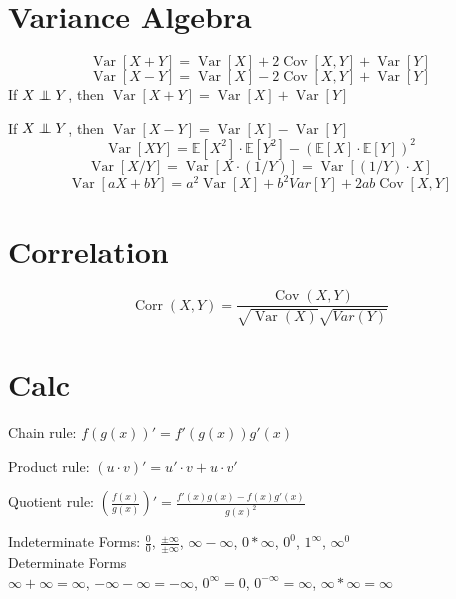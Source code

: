 \documentclass[twocolumn]{amsart}
\newcommand{\E}{\mathbb{E}}
\newcommand{\Cov}{\operatorname{Cov}}
\newcommand{\Corr}{\operatorname{Corr}}
\newcommand{\Var}{\operatorname{Var}}
\newcommand\independent{\protect\mathpalette{\protect\independenT}{\perp}}
\def\independenT#1#2{\mathrel{\rlap{$#1#2$}\mkern3mu{#1#2}}}
\begin{document}
\section*{Variance Algebra}
\begin{equation*}
  \Var[X + Y] = \Var[X] + 2\Cov[X, Y] + \Var[Y]
\end{equation*}
\begin{equation*}
  \Var[X - Y] = \Var[X] - 2\Cov[X, Y] + \Var[Y]
\end{equation*}
If \(X \independent Y\), then $\Var[X + Y] = \Var[X] + \Var[Y]$

If \(X \independent Y\), then $\Var[X - Y] = \Var[X] - \Var[Y]$
\begin{equation*}
  \Var[XY] = \E[X^2] \cdot \E[Y^2] - {(\E[X] \cdot \E[Y])}^2
\end{equation*}
\begin{equation*}
  \Var[X/Y] = \Var[X \cdot (1/Y)] = \Var[(1/Y) \cdot X]
\end{equation*}
\begin{equation*}
  \Var[aX+bY] = a^2\Var[X] + b^2 Var[Y] + 2ab\Cov[X,Y]
\end{equation*}

\section*{Correlation}
\begin{equation*}
  \Corr(X, Y) = \frac{\Cov(X, Y)}{\sqrt{\Var(X)}\sqrt{Var(Y)}}
\end{equation*}


\section*{Calc}
Chain rule: $f(g(x))' = f'(g(x))g'(x)$

Product rule: $(u \cdot v)' = u' \cdot v + u \cdot v'$

Quotient rule: $\left(\frac{f(x)}{g(x)}\right)' = \frac{f'(x)g(x) - f(x)g'(x)}{g(x)^2}$

Indeterminate Forms:
$\frac{0}{0}$, $\frac{\pm\infty}{\pm\infty}$, $\infty-\infty$, $0*\infty$,
$0^{0}$, $1^{\infty}$, $\infty^{0}$ \\
Determinate Forms \\
$\infty+\infty=\infty$, $-\infty-\infty=-\infty$, $0^{\infty}=0$,
$0^{-\infty}=\infty$, $\infty*\infty=\infty$
\end{document}
